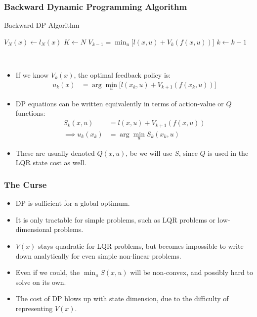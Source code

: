 \subsubsection{Backward Dynamic Programming Algorithm}


\noindent
\begin{algorithm}
	\caption{Backward DP Algorithm}
	\label{alg:bdp}
	\begin{algorithmic}[1]
        \State $V_N(x) \gets l_N(x)$
        \State $K \gets N$
            \State $V_{k-1} = \min_u \big[ l(x,u) + V_k(f(x,u))\big]$ 
            \State $k \gets k-1$
        \EndWhile
	\end{algorithmic}
\end{algorithm}
\\

\begin{itemize}
    \item If we know $V_k(x)$, the optimal feedback policy is:
    \begin{align}
        u_{k}(x) &= \arg\min_u \big[ l(x_k,u) + V_{k+1}(f(x_{k},u)) \big]
    \end{align}
    \item DP equations can be written equivalently in terms of action-value or $Q$ functions:
    \begin{align}
        S_k(x,u) &= l(x,u) + V_{k+1} (f(x,u)) \\
        \implies u_k(x_k) &= \arg\min_u S_k(x_k,u)
    \end{align}
    \item These are usually denoted $Q(x,u)$, be we will use $S$, since $Q$ is used in the LQR state cost as well.
\end{itemize}

\subsubsection{The Curse}
\begin{itemize}
    \item DP is sufficient for a global optimum.
    \item It is only tractable for simple problems, such as LQR problems or low-dimensional problems.
    \item $V(x)$ stays quadratic for LQR problems, but becomes impossible to write down analytically for even simple non-linear problems.
    \item Even if we could, the $\min_u S(x,u)$ will be non-convex, and possibly hard to solve on its own.
    \item The cost of DP blows up with state dimension, due to the difficulty of representing $V(x)$.
\end{itemize}

